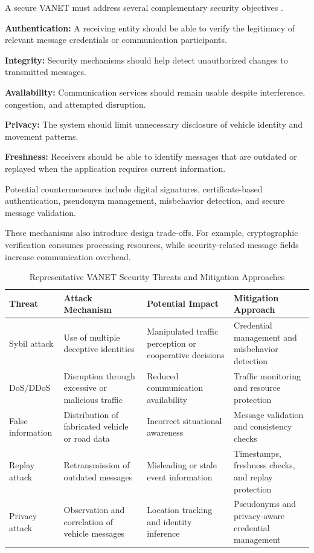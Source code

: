 A secure VANET
must address
several complementary
security objectives
\cite{Zeadally2012,Karagiannis2011}.

\textbf{Authentication:}
A receiving entity
should be able to
verify the legitimacy
of relevant message
credentials or
communication participants.

\textbf{Integrity:}
Security mechanisms
should help detect
unauthorized changes
to transmitted messages.

\textbf{Availability:}
Communication services
should remain usable
despite interference,
congestion, and
attempted disruption.

\textbf{Privacy:}
The system should
limit unnecessary
disclosure of
vehicle identity
and movement patterns.

\textbf{Freshness:}
Receivers should
be able to identify
messages that are
outdated or replayed
when the application
requires current
information.

Potential countermeasures
include digital signatures,
certificate-based
authentication,
pseudonym management,
misbehavior detection,
and secure message
validation.

These mechanisms
also introduce
design trade-offs.
For example,
cryptographic
verification consumes
processing resources,
while security-related
message fields
increase communication
overhead.

\begin{table}[t]
\centering
\caption{Representative VANET Security Threats and Mitigation Approaches}
\label{tab:vanet_security}
\footnotesize
\begin{tabular}{|p{2.6cm}|p{4.0cm}|p{4.0cm}|p{4.0cm}|}
\hline
\textbf{Threat} &
\textbf{Attack Mechanism} &
\textbf{Potential Impact} &
\textbf{Mitigation Approach} \\
\hline
Sybil attack &
Use of multiple deceptive identities &
Manipulated traffic perception or cooperative decisions &
Credential management and misbehavior detection \\
\hline
DoS/DDoS &
Disruption through excessive or malicious traffic &
Reduced communication availability &
Traffic monitoring and resource protection \\
\hline
False information &
Distribution of fabricated vehicle or road data &
Incorrect situational awareness &
Message validation and consistency checks \\
\hline
Replay attack &
Retransmission of outdated messages &
Misleading or stale event information &
Timestamps, freshness checks, and replay protection \\
\hline
Privacy attack &
Observation and correlation of vehicle messages &
Location tracking and identity inference &
Pseudonyms and privacy-aware credential management \\
\hline
\end{tabular}
\end{table}

